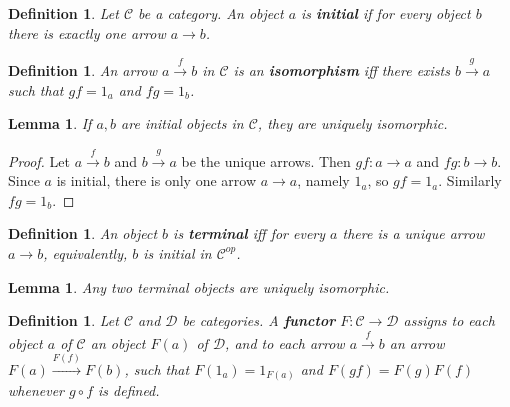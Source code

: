 \documentclass[a4paper,12pt]{article}
\newtheorem{lem}[thm]{Lemma}
\newtheorem{defn}[thm]{Definition}
\begin{document}
\begin{defn}
    Let $\mathcal{C}$ be a category. An object $a$ is \textbf{initial} if for every object $b$ there is exactly one arrow $a\to b$.
\end{defn}
\begin{defn}
    An arrow $a \xrightarrow{f} b$ in $\mathcal{C}$ is an \textbf{isomorphism} iff there exists $b \xrightarrow{g} a$ such that $gf=1_a$ and $fg=1_b$.
\end{defn}
\begin{lem}
    If $a,b$ are initial objects in $\mathcal{C}$, they are uniquely isomorphic.
\end{lem}
\begin{proof}
    Let $a \xrightarrow{f} b$ and $b \xrightarrow{g} a$ be the unique arrows. Then $gf:a\to a$ and $fg:b\to b$. Since $a$ is initial, there is only one arrow $a\to a$, namely $1_a$, so $gf=1_a$. Similarly $fg=1_b$. 
\end{proof}
\begin{defn}
    An object $b$ is \textbf{terminal} iff for every $a$ there is a unique arrow $a\to b$, equivalently, $b$ is initial in $\mathcal{C}^{op}$.
\end{defn}
\begin{lem}
    Any two terminal objects are uniquely isomorphic. 
\end{lem}
\begin{defn}
    Let $\mathcal{C}$ and $\mathcal{D}$ be categories. A \textbf{functor} $F:\mathcal{C} \to \mathcal{D}$ assigns to each object $a$ of $\mathcal{C}$ an object $F(a)$ of $\mathcal{D}$, and to each arrow $a \xrightarrow{f} b$ an arrow $F(a)\xrightarrow{F(f)} F(b)$, such that $F(1_a)=1_{F(a)}$ and $F(gf)=F(g)F(f)$ whenever $g\circ f$ is defined.
\end{defn}
\newpage
\end{document}
